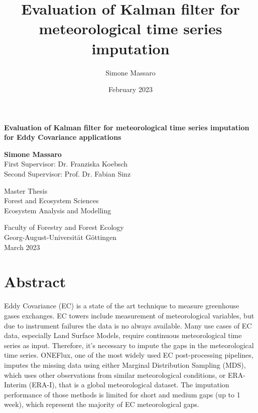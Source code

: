 \documentclass{article}
\title{Evaluation of Kalman filter for meteorological time series imputation}
\author{Simone Massaro}
\date{February 2023}
\let\Oldsection\section
\renewcommand{\section}{\FloatBarrier\Oldsection}
\begin{document}
\newcommand{\vv}[1]{\texttt{#1}}

\begin{titlepage}
    \begin{center}
        \vspace*{1cm}
            
        \Huge
        \textbf{Evaluation of Kalman filter for meteorological time series imputation for Eddy Covariance applications}
            
        \vspace{0.5cm}
        \LARGE
            
        \vspace{1.5cm}
            
        \textbf{Simone Massaro} \\
        \vspace{1cm}
        First Supervisor: Dr. Franziska Koebsch\\
        Second Supervisor: Prof. Dr. Fabian Sinz 
        \vfill
            
        Master Thesis\\
        Forest and Ecosystem Sciences\\
        Ecosystem Analysis and Modelling
            
        \vspace{0.8cm}
            
        \Large
        Faculty of Forestry and Forest Ecology \\
        Georg-August-Universität Göttingen \\
        \vspace{0.3cm}
        March 2023
            
    \end{center}
\end{titlepage}
\clearpage
\tableofcontents
\clearpage

\section*{Abstract}

Eddy Covariance (EC) is a state of the art technique to measure greenhouse gases exchanges. EC towers include measurement of meteorological variables, but due to instrument failures the data is no always available. Many use cases of EC data, especially Land Surface Models, require continuous meteorological time series as input. Therefore, it's necessary to impute the gaps in the meteorological time series. ONEFlux, one of the most widely used EC post-processing pipelines, imputes the missing data using either Marginal Distribution Sampling (MDS), which uses other observations from similar meteorological conditions, or ERA-Interim (ERA-I), that is a global meteorological dataset. The imputation performance of those methods is limited for short and medium gaps (up to 1 week), which represent the majority of EC meteorological gaps.
\end{document}
